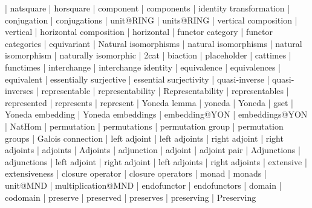     |   natsquare
    |   horsquare
    |   component
    |   components
    |   identity transformation
    |   conjugation
    |   conjugations
    |   unit@RING
    |   units@RING
    |   vertical composition
    |   vertical
    |   horizontal composition
    |   horizontal
    |   functor category
    |   functor categories
    |   equivariant
    |   Natural isomorphisms
    |   natural isomorphisms
    |   natural isomorphism
    |   naturally isomorphic
    |   2cat
    |   biaction
    |   placeholder
    |   cattimes
    |   functimes
    |   interchange
    |   interchange identity
    |   equivalence
    |   equivalences
    |   equivalent
    |   essentially surjective
    |   essential surjectivity
    |   quasi-inverse
    |   quasi-inverses
    |   representable
    |   representability
    |   Representability
    |   representables
    |   represented
    |   represents
    |   represent
    |   Yoneda lemma
    |   yoneda
    |   Yoneda
    |   gset
    |   Yoneda embedding
    |   Yoneda embeddings
    |   embedding@YON
    |   embeddings@YON
    |   NatHom
    |   permutation
    |   permutations
    |   permutation group
    |   permutation groups
    |   Galois connection
    |   left adjoint
    |   left adjoints
    |   right adjoint
    |   right adjoints
    |   adjoints
    |   Adjoints
    |   adjunction
    |   adjoint
    |   adjoint pair
    |   Adjunctions
    |   adjunctions
    |   left adjoint
    |   right adjoint
    |   left adjoints
    |   right adjoints
    |   extensive
    |   extensiveness
    |   closure operator
    |   closure operators
    |   monad
    |   monads
    |   unit@MND
    |   multiplication@MND
    |   endofunctor
    |   endofunctors
    |   domain
    |   codomain
    |   preserve
    |   preserved
    |   preserves
    |   preserving
    |   Preserving
